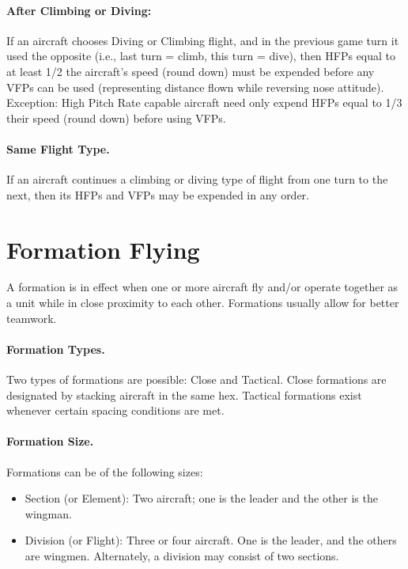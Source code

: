 \begin{advancedrules}
\paragraph{After Climbing or Diving:} 
If an aircraft chooses Diving or Climbing flight, and in the previous game turn it used the opposite (i.e., last turn = climb, this turn = dive), then HFPs equal to at least 1/2 the aircraft's speed (round down) must be expended before any VFPs can be used (representing distance flown while reversing nose attitude). Exception: High Pitch Rate capable aircraft need only expend HFPs equal to 1/3 their speed (round down) before using VFPs.

\paragraph{Same Flight Type.}
If an aircraft continues a climbing or diving type of flight from one turn to the next, then its HFPs and VFPs may be expended in any order.

\section{Formation Flying}

A formation is in effect when one or more aircraft fly and/or operate together as a unit while in close proximity to each other. Formations usually allow for better teamwork.

\paragraph{Formation Types.} Two types of formations are possible: Close and Tactical. Close formations are designated by stacking aircraft in the same hex. Tactical formations exist whenever certain spacing conditions are met.

\paragraph{Formation Size.} Formations can be of the following sizes:

\begin{itemize}
    \item Section (or Element): Two aircraft; one is the leader and the other is the wingman.
    \item Division (or Flight): Three or four aircraft. One is the leader, and the others are wingmen. Alternately, a division may consist of two sections.
\end{itemize}


\end{advancedrules}
